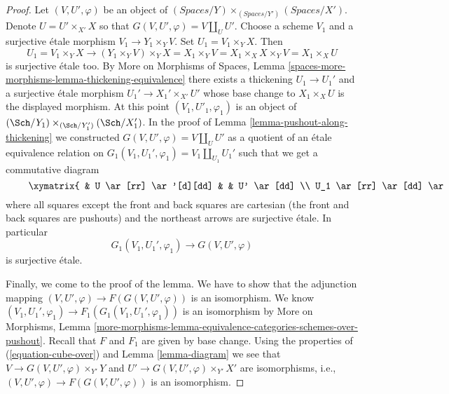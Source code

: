 \begin{proof}
\medskip\noindent
Let $(V, U', \varphi)$ be an object of
$(\textit{Spaces}/Y) \times_{(\textit{Spaces}/Y')} (\textit{Spaces}/X')$.
Denote $U = U' \times_{X'} X$ so that $G(V, U', \varphi) = V \amalg_U U'$.
Choose a scheme $V_1$ and a surjective \'etale morphism
$V_1 \to Y_1 \times_Y V$. Set $U_1 = V_1 \times_Y X$. Then
$$
U_1 = V_1 \times_Y X
\longrightarrow
(Y_1 \times_Y V) \times_Y X =
X_1 \times_Y V = X_1 \times_X X \times_Y V = X_1 \times_X U
$$
is surjective \'etale too. By
More on Morphisms of Spaces, Lemma
\ref{spaces-more-morphisms-lemma-thickening-equivalence}
there exists a thickening $U_1 \to U_1'$ and a surjective \'etale morphism
$U_1' \to X_1' \times_{X'} U'$ whose base change to $X_1 \times_X U$ is the
displayed morphism. At this point $(V_1, U'_1, \varphi_1)$ is an object of
$(\Sch/Y_1) \times_{(\Sch/Y_1')} (\Sch/X_1')$. In the proof of
Lemma \ref{lemma-pushout-along-thickening} we constructed
$G(V, U', \varphi) = V \amalg_U U'$ as a quotient of an \'etale equivalence
relation on $G_1(V_1, U_1', \varphi_1) = V_1 \amalg_{U_1} U_1'$
such that we get a commutative diagram
\begin{equation}
\label{equation-cube-over}
\vcenter{
\xymatrix{
& U \ar[rr] \ar'[d][dd] & & U' \ar[dd] \\
U_1 \ar[rr] \ar[dd] \ar[ru] & & U_1' \ar[dd] \ar[ru] & \\
& V \ar'[r][rr] & & G(V, U', \varphi) \\
V_1 \ar[rr] \ar[ru] & & G_1(V_1, U_1', \varphi_1) \ar[ru]
}
}
\end{equation}
where all squares except the front and back squares are cartesian
(the front and back squares are pushouts) and the northeast arrows
are surjective \'etale. In particular
$$
G_1(V_1, U_1', \varphi_1) \to G(V, U', \varphi)
$$
is surjective \'etale.

\medskip\noindent
Finally, we come to the proof of the lemma. We have to show that the adjunction
mapping $(V, U', \varphi) \to F(G(V, U', \varphi))$ is an isomorphism. We know
$(V_1, U_1', \varphi_1) \to F_1(G_1(V_1, U_1', \varphi_1))$ is an isomorphism
by More on Morphisms, Lemma
\ref{more-morphisms-lemma-equivalence-categories-schemes-over-pushout}.
Recall that $F$ and $F_1$ are given by base change.
Using the properties of (\ref{equation-cube-over})
and Lemma \ref{lemma-diagram}
we see that
$V \to G(V, U', \varphi) \times_{Y'} Y$ and
$U' \to G(V, U', \varphi) \times_{Y'} X'$ are isomorphisms, i.e.,
$(V, U', \varphi) \to F(G(V, U', \varphi))$ is an isomorphism.
\end{proof}

